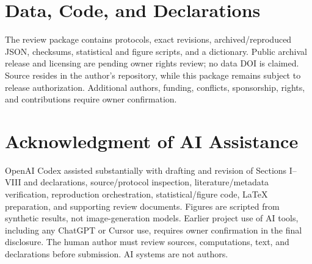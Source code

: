 \section*{Data, Code, and Declarations}
The review package contains protocols, exact revisions, archived/reproduced JSON, checksums, statistical and figure scripts, and a dictionary. Public archival release and licensing are pending owner rights review; no data DOI is claimed. Source resides in the author's  repository, while this package remains subject to release authorization. Additional authors, funding, conflicts, sponsorship, rights, and contributions require owner confirmation.

\section*{Acknowledgment of AI Assistance}
OpenAI Codex assisted substantially with drafting and revision of Sections I--VIII and declarations, source/protocol inspection, literature/metadata verification, reproduction orchestration, statistical/figure code, LaTeX preparation, and supporting review documents. Figures are scripted from synthetic results, not image-generation models. Earlier project use of AI tools, including any ChatGPT or Cursor use, requires owner confirmation in the final disclosure. The human author must review sources, computations, text, and declarations before submission. AI systems are not authors.
